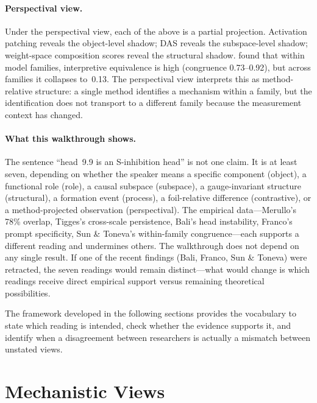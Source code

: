\documentclass{article}
\begin{document}
\paragraph{Perspectival view.}
Under the perspectival view, each of the above is a partial projection.
Activation patching reveals the object-level shadow; DAS reveals the
subspace-level shadow; weight-space composition scores reveal the
structural shadow.  \citet{sun2026} found that within model families,
interpretive equivalence is high (congruence 0.73--0.92), but across
families it collapses to~0.13.  The perspectival view interprets this
as method-relative structure: a single method identifies a mechanism
within a family, but the identification does not transport to a
different family because the measurement context has changed.

\paragraph{What this walkthrough shows.}
The sentence ``head~9.9 is an S-inhibition head'' is not one claim.
It is at least seven, depending on whether the speaker means a
specific component (object), a functional role (role), a causal
subspace (subspace), a gauge-invariant structure (structural), a
formation event (process), a foil-relative difference (contrastive),
or a method-projected observation (perspectival).  The empirical
data---Merullo's 78\% overlap, Tigges's cross-scale persistence,
Bali's head instability, Franco's prompt specificity, Sun \& Toneva's
within-family congruence---each supports a different reading and
undermines others.  The walkthrough does not depend on any single result.  If one of the recent findings (Bali, Franco, Sun \& Toneva) were retracted, the seven readings would remain distinct---what would change is which readings receive direct empirical support versus remaining theoretical possibilities.

The framework developed in the following sections provides the
vocabulary to state which reading is intended, check whether the
evidence supports it, and identify when a disagreement between
researchers is actually a mismatch between unstated views.


\section{Mechanistic Views}\label{sec:views}
\end{document}
